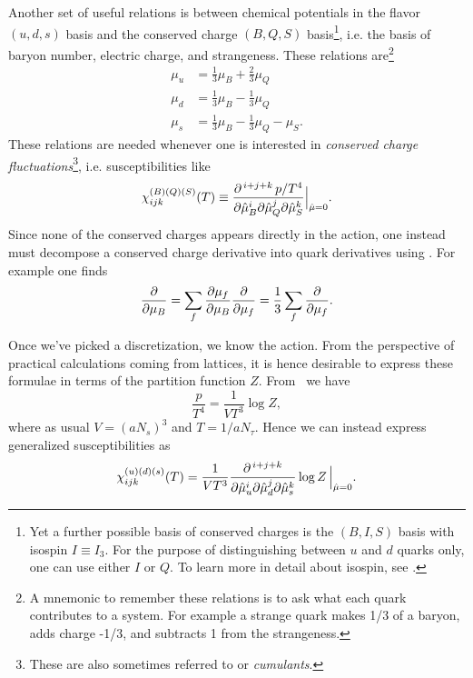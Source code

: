 Another set of useful relations is between chemical potentials in the flavor
$(u,d,s)$ basis and the conserved charge $(B,Q,S)$ basis\footnote{Yet a further
possible basis of conserved charges is the $(B,I,S)$ basis with isospin $I\equiv I_3$.
For the purpose of distinguishing between $u$ and $d$ quarks only, one can use
either $I$ or $Q$.
To learn more in detail about isospin, see .}, i.e. the basis
of baryon number, electric charge, and strangeness. These relations 
are\footnote{A mnemonic to remember these relations is to ask what each quark
contributes to a system. For example a strange quark makes 1/3 of a baryon,
adds charge -1/3, and subtracts 1 from the strangeness.}
\begin{equation}\begin{aligned}\label{eq:quark-conservedCharge}
  \mu_u &= \frac{1}{3}\mu_B + \frac{2}{3}\mu_Q\\
  \mu_d &= \frac{1}{3}\mu_B - \frac{1}{3}\mu_Q\\
  \mu_s &= \frac{1}{3}\mu_B - \frac{1}{3}\mu_Q - \mu_S.
\end{aligned}\end{equation}
These relations are needed whenever one is interested in {\it conserved
charge fluctuations}\footnote{These are also sometimes referred to
or {\it cumulants}.}, 
i.e. susceptibilities like
\begin{equation}
\chi_{ijk}^{(B)(Q)(S)}(T)
  \equiv\frac{\partial^{\,i+j+k}\,p/T^4}{\partial\hat{\mu}_B^i\partial\hat{\mu}_Q^j
                                       \partial\hat{\mu}_S^k}\Big|_{\hat{\mu}=0}.
\end{equation}
Since none of the conserved charges appears directly in the action, one
instead must decompose a conserved charge derivative into quark derivatives
using . For example 
one finds
\begin{equation}
  \pdv{\mu_B}
   =\sum_f\pdv{\mu_f}{\mu_B}\pdv{\mu_f}
   =\frac{1}{3}\sum_f\pdv{\mu_f}.
\end{equation}

Once we've picked a discretization, we know the action. From the perspective of
practical calculations coming from lattices, it is hence desirable to express
these formulae in terms of the partition function $Z$. From~
we have
\begin{equation}
  \frac{p}{T^4}=\frac{1}{VT^3}\log Z,
\end{equation}
where as usual $V=(aN_s)^3$ and $T=1/aN_\tau$.
Hence we can instead
express generalized susceptibilities as
\begin{equation}
\chi_{ijk}^{(u)(d)(s)}(T)
  =\frac{1}{VT^3}\frac{\partial^{\,i+j+k}}{\partial\hat{\mu}_u^i\partial\hat{\mu}_d^j
                                       \partial\hat{\mu}_s^k}\log Z\,\Big|_{\hat{\mu}=0}.
\end{equation}

